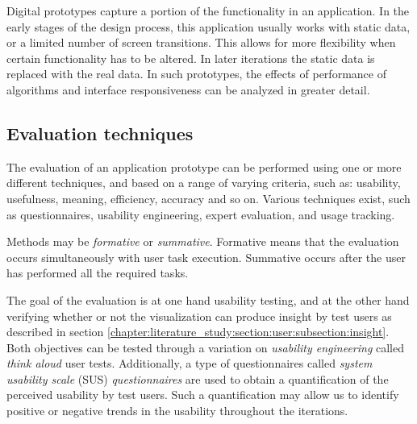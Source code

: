 Digital prototypes capture a portion of the functionality in an application. In the early stages of the design process, this application usually works with static data, or a limited number of screen transitions. This allows for more flexibility when certain functionality has to be altered. In later iterations the static data is replaced with the real data. In such prototypes, the effects of performance of algorithms and interface responsiveness can be analyzed in greater detail.



\subsection{Evaluation techniques}\label{chapter:prototype:section:methodology:subsection:evaluation}

The evaluation of an application prototype can be performed using one or more different techniques, and based on a range of varying criteria, such as: usability, usefulness, meaning, efficiency, accuracy and so on. Various techniques exist, such as questionnaires, usability engineering, expert evaluation, and usage tracking\cite{duval:2012:chi:evaluation}.

Methods may be \emph{formative} or \emph{summative}. Formative means that the evaluation occurs simultaneously with user task execution. Summative occurs after the user has performed all the required tasks\cite{duval:2012:chi:evaluation}.

The goal of the evaluation is at one hand usability testing, and at the other hand verifying whether or not the visualization can produce insight by test users as described in section \ref{chapter:literature_study:section:user:subsection:insight}. Both objectives can be tested through a variation on \emph{usability engineering} called \emph{think aloud} user tests. Additionally, a type of questionnaires called \emph{system usability scale} (SUS) \emph{questionnaires} are used to obtain a quantification of the perceived usability by test users. Such a quantification may allow us to identify positive or negative trends in the usability throughout the iterations.

